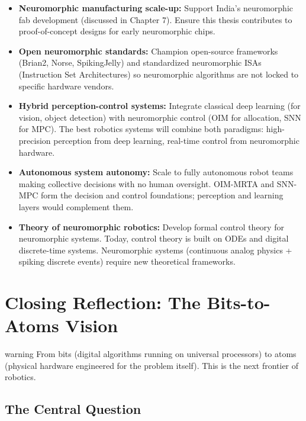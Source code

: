 \begin{itemize}
\item \textbf{Neuromorphic manufacturing scale-up:} Support India's neuromorphic fab development (discussed in Chapter 7). Ensure this thesis contributes to proof-of-concept designs for early neuromorphic chips.

\item \textbf{Open neuromorphic standards:} Champion open-source frameworks (Brian2, Norse, SpikingJelly) and standardized neuromorphic ISAs (Instruction Set Architectures) so neuromorphic algorithms are not locked to specific hardware vendors.

\item \textbf{Hybrid perception-control systems:} Integrate classical deep learning (for vision, object detection) with neuromorphic control (OIM for allocation, SNN for MPC). The best robotics systems will combine both paradigms: high-precision perception from deep learning, real-time control from neuromorphic hardware.

\item \textbf{Autonomous system autonomy:} Scale to fully autonomous robot teams making collective decisions with no human oversight. OIM-MRTA and SNN-MPC form the decision and control foundations; perception and learning layers would complement them.

\item \textbf{Theory of neuromorphic robotics:} Develop formal control theory for neuromorphic systems. Today, control theory is built on ODEs and digital discrete-time systems. Neuromorphic systems (continuous analog physics + spiking discrete events) require new theoretical frameworks.
\end{itemize}

\section{Closing Reflection: The Bits-to-Atoms Vision}
\begin{block}{warning}
From bits (digital algorithms running on universal processors) to atoms (physical hardware engineered for the problem itself). This is the next frontier of robotics.
\end{block}


\subsection{The Central Question}


